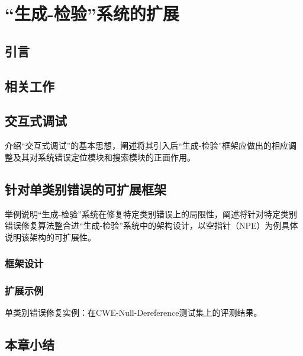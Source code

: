\chapter{“生成-检验”系统的扩展}
\label{cha:ext}

\section{引言}%
\section{相关工作}%

\section{交互式调试}%
介绍“交互式调试”的基本思想，阐述将其引入后“生成-检验”框架应做出的相应调整及其对系统错误定位模块和搜索模块的正面作用。
\section{针对单类别错误的可扩展框架}%
举例说明“生成-检验”系统在修复特定类别错误上的局限性，阐述将针对特定类别错误修复算法整合进“生成-检验”系统中的架构设计，以空指针（NPE）为例具体说明该架构的可扩展性。
\subsection{框架设计}%
\subsection{扩展示例}%
单类别错误修复实例：在CWE-Null-Dereference测试集上的评测结果。
\section{本章小结}%